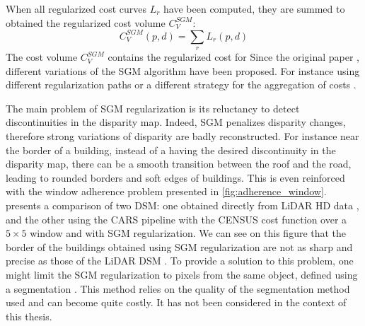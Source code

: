 When all regularized cost curves $L_r$ have been computed, they are summed to obtained the regularized cost volume $C_V^{SGM}$:
\begin{equation}
    C_V^{SGM}(p, d) = \sum_r L_r(p,d)
\end{equation}
The cost volume $C^{SGM}_V$ contains the regularized cost for 
Since the original paper \cite{hirschmuller_accurate_2005}, different variations of the SGM algorithm have been proposed. For instance using different regularization paths \cite{facciolo_mgm_2015} or a different strategy for the aggregation of costs \cite{poggi_learning_2016}.

The main problem of SGM regularization is its reluctancy to detect discontinuities in the disparity map. Indeed, SGM penalizes disparity changes, therefore strong variations of disparity are badly reconstructed. For instance near the border of a building, instead of a having the desired discontinuity in the disparity map, there can be a smooth transition  between the roof and the road, leading to rounded borders and soft edges of buildings. This is even reinforced with the window adherence problem presented in \ref{fig:adherence_window}.  presents a comparison of two DSM: one obtained directly from LiDAR HD data \cite{monnet_lidarhd_2023}, and the other using the CARS pipeline with the CENSUS cost function over a $5\times5$ window and with SGM regularization. We can see on this figure that the border of the buildings obtained using SGM regularization are not as sharp and precise as those of the LiDAR DSM . To provide a solution to this problem, one might limit the SGM regularization to pixels from the same object, defined using a segmentation \cite{dumas_improving_2022}. This method relies on the quality of the segmentation method used and can become quite costly. It has not been considered in the context of this thesis. 


